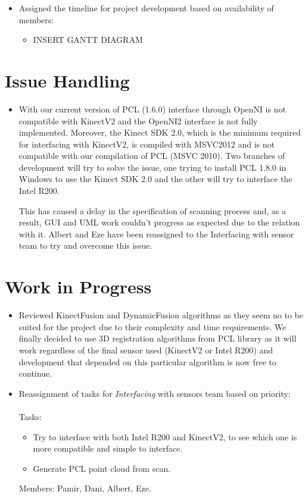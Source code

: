 \documentclass[11pt]{article} %
\begin{document}
\begin{itemize}
	\item Assigned the timeline for project development based on availability of members:
	\begin{itemize}
		\item INSERT GANTT DIAGRAM
	\end{itemize}
	
\end{itemize}

\section{Issue Handling}
\begin{itemize}	
	\item With our current version of PCL (1.6.0) interface through OpenNI is not compatible with KinectV2 and the OpenNI2 interface is not fully implemented. Moreover, the Kinect SDK 2.0, which is the minimum required for interfacing with KinectV2, is compiled with MSVC2012 and is not compatible with our compilation of PCL (MSVC 2010). Two branches of development will try to solve the issue, one trying to install PCL 1.8.0 in Windows to use the Kinect SDK 2.0 and the other will try to interface the Intel R200.

	This has caused a delay in the specification of scanning process and, as a result, GUI and UML work couldn't progress as expected due to the relation with it. Albert and Eze have been reassigned to the Interfacing with sensor team to try and overcome this issue.
\end{itemize}

\section{Work in Progress}

\begin{itemize}
	\item Reviewed KinectFusion and DynamicFusion algorithms  as they seem no to be suited for the project due to their complexity and time requirements. We finally decided to use 3D registration algorithms from PCL library as it will work regardless of the final sensor used (KinectV2 or Intel R200) and development that depended on this particular algorithm is now free to continue.
	
	\item Reassignment of tasks for \emph{Interfacing} with sensors team based on priority:\\
		~\\Tasks:
		\begin{itemize}
			\item Try to interface with both Intel R200 and KinectV2, to see which one is more compatible and simple to interface.
			\item  Generate PCL point cloud from scan.
		\end{itemize}
		Members: Pamir, Dani, Albert, Eze. 
		
\end{itemize}
\end{document}
